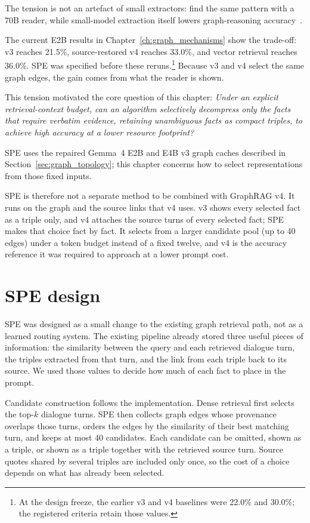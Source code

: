 The tension is not an artefact of small extractors: \citet{rag_vs_graphrag} find the same pattern
with a 70B reader, while small-model extraction itself lowers graph-reasoning
accuracy~\citep{kelesis2026}.

The current E2B results in Chapter~\ref{ch:graph_mechanisms} show the trade-off: v3 reaches
21.5\%, source-restored v4 reaches 33.0\%, and vector retrieval reaches 36.0\%.
SPE was specified before these reruns.\footnote{At the design freeze, the
earlier v3 and v4 baselines were 22.0\% and 30.0\%; the registered criteria retain
those values.} Because v3 and v4 select the same graph edges, the gain comes from what the reader
is shown.

This tension motivated the core question of this chapter: \emph{Under an explicit retrieval-context
budget, can an algorithm selectively decompress only the facts that require verbatim evidence,
retaining unambiguous facts as compact triples, to achieve high accuracy at a lower resource footprint?}

SPE uses the repaired Gemma~4 E2B and E4B v3 graph caches described in
Section~\ref{sec:graph_topology}; this chapter concerns how to select representations
from those fixed inputs.

SPE is therefore not a separate method to be combined with GraphRAG v4. It runs on the graph and
the source links that v4 uses. v3 shows every selected fact as a triple only, and v4 attaches the
source turns of every selected fact; SPE makes that choice fact by fact. It selects from a larger
candidate pool (up to 40 edges) under a token budget instead of a fixed twelve, and v4 is the
accuracy reference it was required to approach at a lower prompt cost.

\section{SPE design}
\label{sec:spe_formulation}

SPE was designed as a small change to the existing graph retrieval path, not as a learned routing
system. The existing pipeline already stored three useful pieces of information: the similarity between
the query and each retrieved dialogue turn, the triples extracted from that turn, and the link from each
triple back to its source. We used those values to decide how much of each fact to place in the prompt.

Candidate construction follows the implementation. Dense retrieval first selects the top-$k$ dialogue
turns. SPE then collects graph edges whose provenance overlaps those turns, orders the edges by the
similarity of their best matching turn, and keeps at most 40 candidates. Each candidate can be omitted,
shown as a triple, or shown as a triple together with the retrieved source turn. Source quotes shared by
several triples are included only once, so the cost of a choice depends on what has already been selected.


